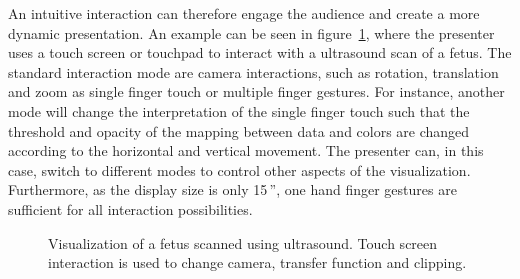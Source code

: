 \documentclass[review,journal]{vgtc}         %
\begin{document}
An intuitive interaction can therefore engage the audience and create a more dynamic presentation.
An example can be seen in figure~\ref{img:touch_workstation}, where the presenter uses a touch screen or touchpad to interact with a ultrasound scan of a fetus.
The standard interaction mode are camera interactions, such as rotation, translation and zoom as single finger touch or multiple finger gestures.
For instance, another mode will change the interpretation of the single finger touch such that the threshold and opacity of the mapping between data and colors are changed according to the horizontal and vertical movement. 
The presenter can, in this case, switch to different modes to control other aspects of the visualization.
Furthermore, as the display size is only 15\,'', one hand finger gestures are sufficient for all interaction possibilities.

%
%
%
%

\begin{figure}
	\centering
	\caption{Visualization of a fetus scanned using ultrasound. Touch screen interaction is used to change camera, transfer function and clipping.}
	\label{img:touch_workstation}
\end{figure}
\end{document}
